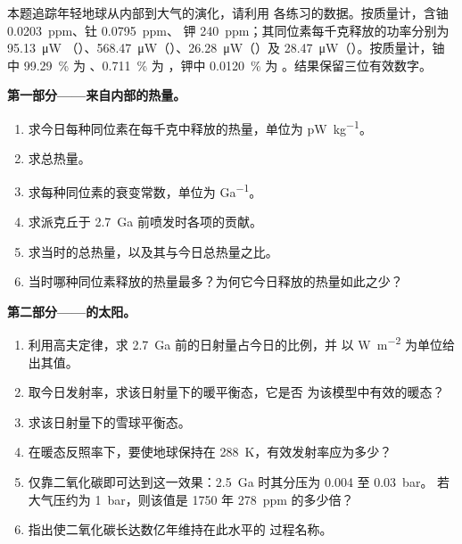 \begin{problem}\label{pb:b2:precambrian-earth:1}
本题追踪年轻地球从内部到大气的演化，请利用
各练习的数据。按质量计，含铀 \qty{0.0203}{ppm}、钍 \qty{0.0795}{ppm}、
钾 \qty{240}{ppm}；其同位素每千克释放的功率分别为 \qty{95.13}{\micro W}
（）、\qty{568.47}{\micro W}（）、\qty{26.28}{\micro W}（）及
\qty{28.47}{\micro W}（）。按质量计，铀中
\qty{99.29}{\percent} 为 、\qty{0.711}{\percent} 为 ，钾中
\qty{0.0120}{\percent} 为 。结果保留三位有效数字。

\noindent\textbf{第一部分——来自内部的热量。}
\begin{enumerate}
  \item 求今日每种同位素在每千克中释放的热量，单位为
        \unit{pW.kg^{-1}}。
  \item 求总热量。
  \item 求每种同位素的衰变常数，单位为 \unit{Ga^{-1}}。
  \item 求派克丘于 \qty{2.7}{Ga} 前喷发时各项的贡献。
  \item 求当时的总热量，以及其与今日总热量之比。
  \item 当时哪种同位素释放的热量最多？为何它今日释放的热量如此之少？
\end{enumerate}

\noindent\textbf{第二部分——的太阳。}
\begin{enumerate}[resume]
  \item 利用高夫定律，求 \qty{2.7}{Ga} 前的日射量占今日的比例，并
        以 \unit{W.m^{-2}} 为单位给出其值。
  \item 取今日发射率，求该日射量下的暖平衡态，它是否
        为该模型中有效的暖态？
  \item 求该日射量下的雪球平衡态。
  \item 在暖态反照率下，要使地球保持在 \qty{288}{K}，有效发射率应为多少？
  \item 仅靠二氧化碳即可达到这一效果：\qty{2.5}{Ga} 时其分压为 0.004 至 \qty{0.03}{bar}。
        若大气压约为 \qty{1}{bar}，则该值是 1750 年
        \qty{278}{ppm} 的多少倍？
  \item 指出使二氧化碳长达数亿年维持在此水平的
        过程名称。
\end{enumerate}


\end{problem}
